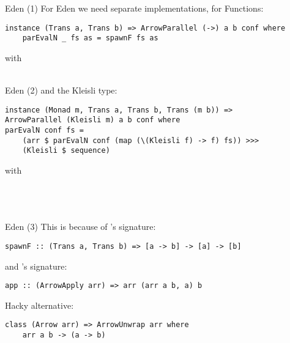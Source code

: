 \begin{frame}[fragile]{Eden (1)}
For Eden we need separate implementations, for Functions:
\begin{lstlisting}[frame=htrbl]
instance (Trans a, Trans b) => ArrowParallel (->) a b conf where
	parEvalN _ fs as = spawnF fs as
\end{lstlisting}
with
\\~\\
\end{frame}

\begin{frame}[fragile]{Eden (2)}
and the Kleisli type:
\begin{lstlisting}[frame=htrbl]
instance (Monad m, Trans a, Trans b, Trans (m b)) =>
ArrowParallel (Kleisli m) a b conf where
parEvalN conf fs =
	(arr $ parEvalN conf (map (\(Kleisli f) -> f) fs)) >>>
	(Kleisli $ sequence)
\end{lstlisting}
with
\\~\\
\\
\\
\end{frame}

\begin{frame}[fragile]{Eden (3)}
This is because of 's signature:
\begin{lstlisting}[frame=htrbl]
spawnF :: (Trans a, Trans b) => [a -> b] -> [a] -> [b]
\end{lstlisting}
and 's signature:
\begin{lstlisting}[frame=htrbl]
app :: (ArrowApply arr) => arr (arr a b, a) b
\end{lstlisting}
\pause
Hacky alternative:
\begin{lstlisting}[frame=htrbl]
class (Arrow arr) => ArrowUnwrap arr where
	arr a b -> (a -> b)
\end{lstlisting}
\end{frame}